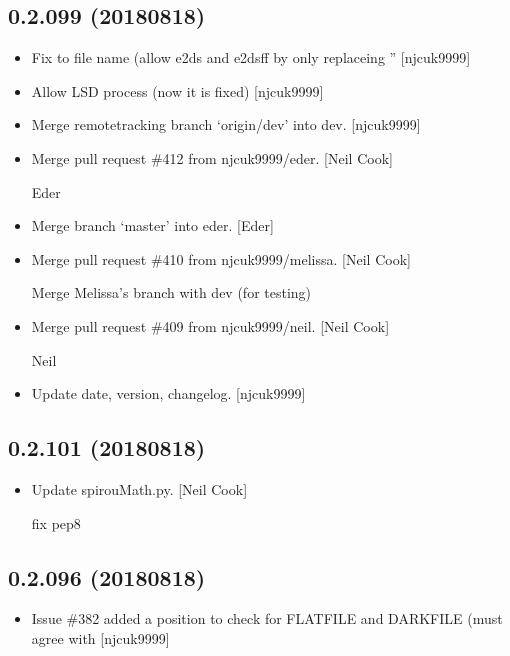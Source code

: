 \documentclass[a4paper,10pt,english]{report}
\begin{document}
\subsection{0.2.099 (2018\sphinxhyphen{}08\sphinxhyphen{}18)}
\label{\detokenize{misc/changelog:id380}}\begin{itemize}
\item {} 
Fix to file name (allow e2ds and e2dsff by only replaceing ”
{[}njcuk9999{]}

\item {} 
Allow LSD process (now it is fixed) {[}njcuk9999{]}

\item {} 
Merge remote\sphinxhyphen{}tracking branch ‘origin/dev’ into dev. {[}njcuk9999{]}

\item {} 
Merge pull request \#412 from njcuk9999/eder. {[}Neil Cook{]}

Eder

\item {} 
Merge branch ‘master’ into eder. {[}Eder{]}

\item {} 
Merge pull request \#410 from njcuk9999/melissa. {[}Neil Cook{]}

Merge Melissa’s branch with dev (for testing)

\item {} 
Merge pull request \#409 from njcuk9999/neil. {[}Neil Cook{]}

Neil

\item {} 
Update date, version, changelog. {[}njcuk9999{]}

\end{itemize}


\subsection{0.2.101 (2018\sphinxhyphen{}08\sphinxhyphen{}18)}
\label{\detokenize{misc/changelog:id381}}\begin{itemize}
\item {} 
Update spirouMath.py. {[}Neil Cook{]}

fix pep8

\end{itemize}


\subsection{0.2.096 (2018\sphinxhyphen{}08\sphinxhyphen{}18)}
\label{\detokenize{misc/changelog:id382}}\begin{itemize}
\item {} 
Issue \#382 \sphinxhyphen{} added a position to check for FLATFILE and DARKFILE (must
agree with  {[}njcuk9999{]}

\end{itemize}
\end{document}
